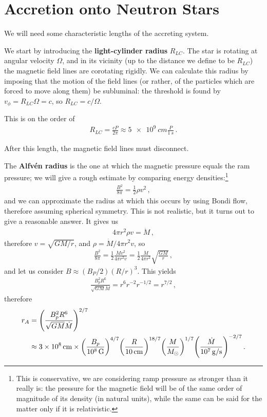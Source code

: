 \documentclass[main.tex]{subfiles}
\begin{document}
\section{Accretion onto Neutron Stars}

We will need some characteristic lengths of the accreting system.

We start by introducing the \textbf{light-cylinder radius} \(R_{LC}\).
The star is rotating at angular velocity \(\Omega \), and in its vicinity (up to the distance we define to be \(R_{LC}\)) the magnetic field lines are corotating rigidly. 
We can calculate this radius by imposing that the motion of the field lines (or rather, of the particles which are forced to move along them) be subluminal: the threshold is found by \(v_\phi = R_{LC} \Omega = c\), so \(R_{LC} = c/  \Omega \).

This is on the order of 
%
\begin{align}
R_{LC} = \frac{cP}{2 \pi } \approx \SI{5e9}{cm} \frac{P}{\SI{1}{s}}
\,.
\end{align}

After this length, the magnetic field lines must disconnect. 

The \textbf{Alfvén radius} is the one at which the magnetic pressure equals the ram pressure; we will give a rough estimate by comparing energy densities:\footnote{This is conservative, we are considering ramp pressure as stronger than it really is: the pressure for the magnetic field will be of the same order of magnitude of its density (in natural units), while the same can be said for the matter only if it is relativistic.}
%
\begin{align}
\frac{B^2}{8 \pi } = \frac{1}{2} \rho v^2
\,,
\end{align}
%
and we can approximate the radius at which this occurs by using Bondi flow, therefore assuming spherical symmetry. This is not realistic, but it turns out to give a reasonable answer.
It gives us 
%
\begin{align}
4 \pi r^2\rho v = \dot{M}
\,,
\end{align}
%
therefore \(v = \sqrt{GM /r}\), and \(\rho = \dot{M} / 4 \pi r^2 v \), so 
%
\begin{align}
\frac{B^2}{8 \pi } = \frac{1}{2} \frac{\dot{M} v^2}{4 \pi r^2v}
= \frac{1}{2} \frac{\dot{M}}{4 \pi r^2} \sqrt{ \frac{GM}{r}}
\,,
\end{align}
%
and let us consider \(B \approx (B_P /2) (R / r)^3\). 
This yields 
%
\begin{align}
\frac{B_p^2 R^{6}}{\sqrt{GM} \dot{M}} = r^{6} r^{-2} r^{-1/2} = r^{7/2}
\,,
\end{align}
%
therefore 
%
\begin{align}
r_A &= \qty(\frac{B_p^2 R^{6}}{\sqrt{GM} \dot{M}})^{2/7}  \\
&\approx \SI{3e8}{cm} \times \qty(\frac{B_p}{\SI{e8}{G}})^{4/7}
\qty(\frac{R}{\SI{10}{cm}})^{18/7} \qty(\frac{M}{M_{\odot}})^{1/7} 
\qty(\frac{\dot{M}}{\SI{e7}{g/s}})^{-2/7}
\,.
\end{align}
\end{document}
